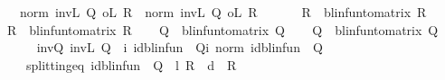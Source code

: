 \begin{isabellebody}
\ \ \ {\isachardoublequoteopen}norm\ {\isacharparenleft}{\kern0pt}inv\isactrlsub L\ Q{}\ o\isactrlsub L\ R{}{\isacharparenright}{\kern0pt}\ {\isasymle}\ norm\ {\isacharparenleft}{\kern0pt}inv\isactrlsub L\ Q{}\ o\isactrlsub L\ R{}{\isacharparenright}{\kern0pt}{\isachardoublequoteclose}\ \isanewline
%
\isadelimproof
%
\endisadelimproof
%
\isatagproof
{}\isamarkupfalse%
\ {\isacharminus}{\kern0pt}\isanewline
\ \ \isamarkupfalse%
\ {\isacharquery}{\kern0pt}R{}\ {\isacharequal}{\kern0pt}\ {\isachardoublequoteopen}blinfun{\isacharunderscore}{\kern0pt}to{\isacharunderscore}{\kern0pt}matrix\ R{}{\isachardoublequoteclose}\isanewline
\ \ \isamarkupfalse%
\ {\isacharquery}{\kern0pt}R{}\ {\isacharequal}{\kern0pt}\ {\isachardoublequoteopen}blinfun{\isacharunderscore}{\kern0pt}to{\isacharunderscore}{\kern0pt}matrix\ R{}{\isachardoublequoteclose}\isanewline
\ \ \isamarkupfalse%
\ {\isacharquery}{\kern0pt}Q{}\ {\isacharequal}{\kern0pt}\ {\isachardoublequoteopen}blinfun{\isacharunderscore}{\kern0pt}to{\isacharunderscore}{\kern0pt}matrix\ Q{}{\isachardoublequoteclose}\isanewline
\ \ \isamarkupfalse%
\ {\isacharquery}{\kern0pt}Q{}\ {\isacharequal}{\kern0pt}\ {\isachardoublequoteopen}blinfun{\isacharunderscore}{\kern0pt}to{\isacharunderscore}{\kern0pt}matrix\ Q{}{\isachardoublequoteclose}\isanewline
\ \ \isamarkupfalse%
\ \isanewline
\ \ \ \ inv{\isacharunderscore}{\kern0pt}Q{\isacharcolon}{\kern0pt}\ {\isachardoublequoteopen}inv\isactrlsub L\ Q\ {\isacharequal}{\kern0pt}\ {\isacharparenleft}{\kern0pt}{\isasymSum}i{\isachardot}{\kern0pt}\ {\isacharparenleft}{\kern0pt}id{\isacharunderscore}{\kern0pt}blinfun\ {\isacharminus}{\kern0pt}\ Q{\isacharparenright}{\kern0pt}{\isacharcircum}{\kern0pt}{\isacharcircum}{\kern0pt}i{\isacharparenright}{\kern0pt}{\isachardoublequoteclose}\ {\isachardoublequoteopen}norm\ {\isacharparenleft}{\kern0pt}id{\isacharunderscore}{\kern0pt}blinfun\ {\isacharminus}{\kern0pt}\ Q{\isacharparenright}{\kern0pt}\ {\isacharless}{\kern0pt}\ {}{\isachardoublequoteclose}\ \isanewline
\ \ \ \ splitting{\isacharunderscore}{\kern0pt}eq{\isacharcolon}{\kern0pt}\ {\isachardoublequoteopen}id{\isacharunderscore}{\kern0pt}blinfun\ {\isacharminus}{\kern0pt}\ Q\ {\isacharequal}{\kern0pt}\ l\ {\isacharasterisk}{\kern0pt}\isactrlsub R\ {\isasymP}\ d\ {\isacharminus}{\kern0pt}\ R{\isachardoublequoteclose}\ \isanewline

\end{isabellebody}
